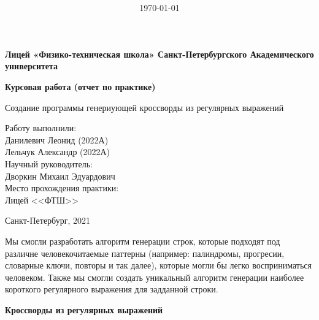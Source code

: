 \documentclass[12pt]{report}
\title{\bf \ReportTheme}
\author{\it \ReportAuthor}
\date{\today}
\begin{document}

    \begin{center}
    \large { {\bf Лицей «Физико-техническая школа»  Санкт-Петербургского Академического университета   } } 
    
    \vspace*{6\baselineskip}
    
    \vfill
    \large { {\bf Курсовая работа (отчет по практике) } } 
    
    \vspace*{6\baselineskip}
    
    Создание программы генериующей кроссворды из регулярных выражений \\
    \vspace*{3\baselineskip}
    
    \end{center}        
    \begin{flushright}
        Работу выполнили: \\
        Данилевич Леонид (2022А) \\
        Лельчук Александр (2022А) \\
        Научный руководитель: \\
        Дворкин Михаил Эдуардович \\
        Место прохождения практики: \\
        Лицей <<ФТШ>>
    \end{flushright}
    \vspace*{5\baselineskip}
    \begin{center}
        Санкт-Петербург, 2021
    \end{center}        
    \newpage %
     Мы смогли разработать алгоритм генерации строк, которые подходят под различне человекочитаемые паттерны (например: палиндромы, прогресии, словарные ключи, повторы и так далее), которые могли бы легко восприниматься человеком.
     Также мы смогли создать уникальный алгоритм генерации наиболее короткого регулярного выражения для задданной строки.

    
    \newpage %
    { \center \bf Кроссворды из регулярных выражений }
\tableofcontents
    \newpage %
\end{document}
